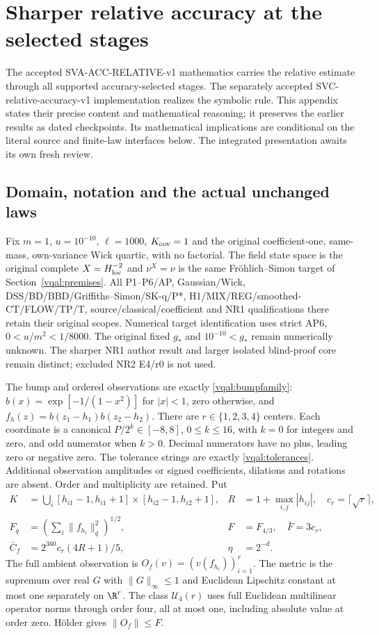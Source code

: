 \clearpage
\section{Sharper relative accuracy at the selected stages}
\label{sva:current}

The accepted SVA-ACC-RELATIVE-v1 mathematics carries the relative estimate
through all supported accuracy-selected stages. The separately accepted
SVC-relative-accuracy-v1 implementation realizes the symbolic rule.
This appendix states their precise content and mathematical reasoning;
it preserves the earlier results as dated checkpoints. Its mathematical
implications are conditional on the literal source and finite-law
interfaces below. The integrated presentation awaits its own fresh review.

\subsection{Domain, notation and the actual unchanged laws}
\label{sva:domain}

Fix $m=1$, $u=10^{-10}$, $\ell=1000$, $K_{\rm cov}=1$ and the original
coefficient-one, same-mass, own-variance Wick quartic, with no factorial.
The field state space is the original complete $X=H^{-2}_{\rm loc}$ and
$\nu^X=\nu$ is the same Fr\"ohlich--Simon target of
Section~\ref{vqal:premises}. All P1--P6/AP, Gaussian/Wick,
DSS/BD/BBD/Griffiths--Simon/SK-q/P*, H1/MIX/REG/smoothed-CT/FLOW/TP/T,
source/classical/coefficient and NR1 qualifications there retain their
original scopes. Numerical target identification uses strict AP6,
$0<u/m^2<1/8000$. The original fixed $g_*$ and $10^{-10}<g_*$ remain
numerically unknown. The sharper NR1 author result and larger isolated
blind-proof core remain distinct; excluded NR2 E4/r0 is not used.

The bump and ordered observations are exactly
\eqref{vqal:bumpfamily}: $b(x)=\exp[-1/(1-x^2)]$ for $|x|<1$, zero
otherwise, and $f_h(z)=b(z_1-h_1)b(z_2-h_2)$. There are $r\in\{1,2,3,4\}$
centers. Each coordinate is a canonical $P/2^k\in[-8,8]$,
$0\le k\le16$, with $k=0$ for integers and zero, and odd numerator
when $k>0$. Decimal numerators have no plus, leading zero or negative
zero. The tolerance strings are exactly \eqref{vqal:tolerances}.
Additional observation amplitudes or signed coefficients, dilations and
rotations are absent. Order and multiplicity are retained. Put
\begin{align}\label{sva:geometry}
 K&=\bigcup_i[h_{i1}-1,h_{i1}+1]\times[h_{i2}-1,h_{i2}+1],
 &R&=1+\max_{i,j}|h_{ij}|,\quad c_r=\lceil\sqrt r\rceil,\nonumber\\
 F_q&=\left(\sum_i\|f_{h_i}\|_q^2\right)^{1/2},
 &F&=F_{4/3},\quad\bar F=3c_r,\nonumber\\
 \bar C_f&=2^{360}c_r(4R+1)/5,
 &\eta&=2^{-d}.
\end{align}
The full ambient observation is $O_f(v)=(v(f_{h_i}))_{i=1}^r$.
The metric is the supremum over real $G$ with $\|G\|_\infty\le1$
and Euclidean Lipschitz constant at most one separately on $\R^r$.
The class $\mathcal U_4(r)$ uses full Euclidean multilinear operator
norms through order four, all at most one, including absolute value at
order zero. H\"older gives $\|O_f\|\le F$.

